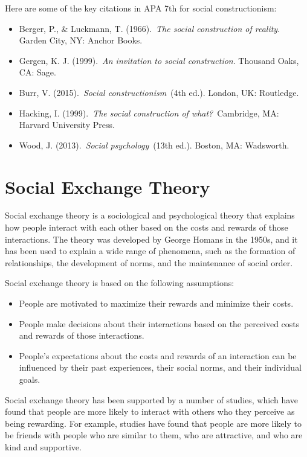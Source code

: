 \documentclass[
  b5paper]{book}
\begin{document}
Here are some of the key citations in APA 7th for social constructionism:

\begin{itemize}
\item
  Berger, P., \& Luckmann, T. (1966).~\emph{The social construction of reality}. Garden City, NY: Anchor Books.
\item
  Gergen, K. J. (1999).~\emph{An invitation to social construction}. Thousand Oaks, CA: Sage.
\item
  Burr, V. (2015).~\emph{Social constructionism}~(4th ed.). London, UK: Routledge.
\item
  Hacking, I. (1999).~\emph{The social construction of what?}~Cambridge, MA: Harvard University Press.
\item
  Wood, J. (2013).~\emph{Social psychology}~(13th ed.). Boston, MA: Wadsworth.
\end{itemize}

\hypertarget{social-exchange-theory}{%
\section{Social Exchange Theory}\label{social-exchange-theory}}

Social exchange theory is a sociological and psychological theory that explains how people interact with each other based on the costs and rewards of those interactions. The theory was developed by George Homans in the 1950s, and it has been used to explain a wide range of phenomena, such as the formation of relationships, the development of norms, and the maintenance of social order.

Social exchange theory is based on the following assumptions:

\begin{itemize}
\item
  People are motivated to maximize their rewards and minimize their costs.
\item
  People make decisions about their interactions based on the perceived costs and rewards of those interactions.
\item
  People's expectations about the costs and rewards of an interaction can be influenced by their past experiences, their social norms, and their individual goals.
\end{itemize}

Social exchange theory has been supported by a number of studies, which have found that people are more likely to interact with others who they perceive as being rewarding. For example, studies have found that people are more likely to be friends with people who are similar to them, who are attractive, and who are kind and supportive.
\end{document}
